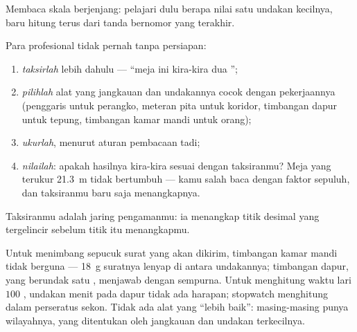 \begin{omfigure}

{\small Membaca skala berjenjang: pelajari dulu berapa nilai satu
undakan kecilnya, baru hitung terus dari tanda bernomor yang terakhir.}
\end{omfigure}

\begin{method}\label{met:g6:measurement-in-science:estimate}
Para profesional tidak pernah  tanpa persiapan:
\begin{enumerate}
  \item \emph{taksirlah} lebih dahulu --- ``meja ini kira-kira dua
        '';
  \item \emph{pilihlah} alat yang jangkauan dan undakannya cocok
        dengan pekerjaannya (penggaris untuk perangko, meteran pita
        untuk koridor, timbangan dapur untuk tepung, timbangan kamar
        mandi untuk orang);
  \item \emph{ukurlah}, menurut aturan pembacaan tadi;
  \item \emph{nilailah}: apakah hasilnya kira-kira sesuai dengan
        taksiranmu? Meja yang terukur \qty{21.3}{m} tidak bertumbuh
        --- kamu salah baca dengan faktor sepuluh, dan taksiranmu
        baru saja menangkapnya.
\end{enumerate}
Taksiranmu adalah jaring pengamanmu: ia menangkap titik desimal yang
tergelincir sebelum titik itu menangkapmu.
\end{method}

\begin{example}\label{ex:g6:measurement-in-science:choose}
Untuk menimbang sepucuk surat yang akan dikirim, timbangan kamar mandi
tidak berguna --- \qty{18}{g} suratnya lenyap di antara undakannya;
timbangan dapur, yang berundak satu , menjawab dengan sempurna.
Untuk menghitung waktu lari $100$ , undakan menit pada  dapur
tidak ada harapan; stopwatch menghitung dalam perseratus sekon. Tidak
ada alat yang ``lebih baik'': masing-masing punya wilayahnya, yang
ditentukan oleh jangkauan dan undakan terkecilnya.
\end{example}


